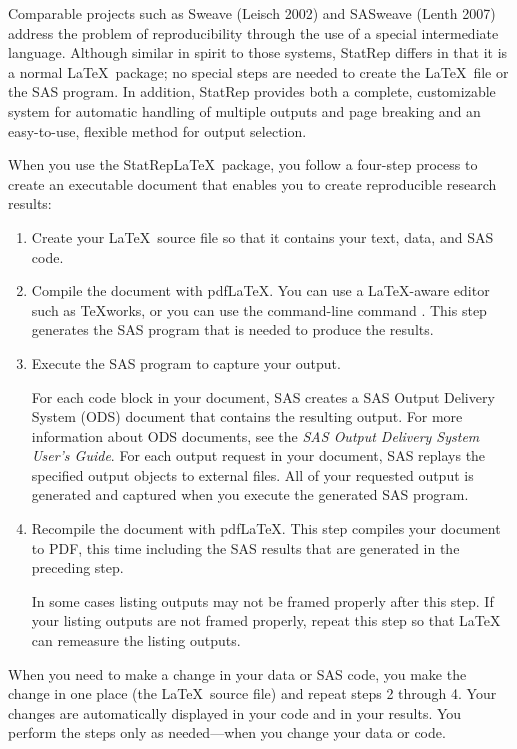 \documentclass[article,oneside]{memoir}
\newcommand*{\StatRep}{\textsf{StatRep}\xspace}
\begin{document}
Comparable projects such as Sweave (Leisch 2002) and SASweave  (Lenth 2007)
address the problem of reproducibility through the use of a special intermediate language.
Although similar in spirit to those systems, \StatRep differs in that it is a
normal \LaTeX\ package; no special steps are needed to create the \LaTeX\
file or the SAS program.   In addition, \StatRep provides both a complete, customizable system for
automatic handling of multiple outputs and page breaking and an easy-to-use,
flexible method for output selection.

When you use the \StatRep \LaTeX\ package, you follow a four-step process to
create an executable document that enables you to create
reproducible research results:
\begin{enumerate}
\item Create your \LaTeX\ source file so that it contains your text, data, and SAS code.

\item Compile the document with pdf\LaTeX. You can use a LaTeX-aware
      editor such as \TeX works, or you can use the command-line command .
      This step generates the SAS program that is needed to produce the results.

\item Execute the SAS program to capture your output.

For each code block in your document,
SAS creates a SAS Output Delivery System (ODS) document that contains the resulting output.
For more information about ODS documents, see the
\textit{SAS Output Delivery System User's Guide}.
For each output request in your document, SAS replays the specified output objects
to external files. All of your requested output is generated and captured when you
execute the generated SAS program.

\item Recompile the document with pdfLaTeX. This step compiles your
      document to PDF, this time including the SAS results
      that are generated in the preceding step.

      In some cases listing outputs may not be framed properly after this step.
      If your listing outputs are not framed properly, repeat this step so that
      LaTeX can remeasure the listing outputs.

\end{enumerate}

When you need to make a change in your data or SAS code, you make the change in
one place (the \LaTeX\ source file) and repeat steps 2 through 4.
Your changes are automatically displayed in your code and in your results.
You perform the steps only as needed---when you change your data or code.
\end{document}
